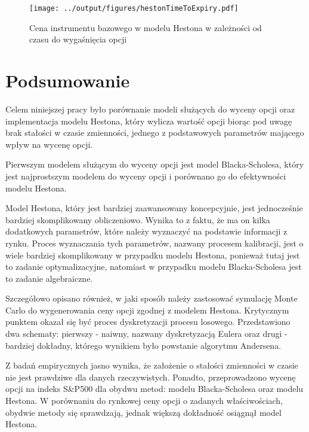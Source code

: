 \documentclass{pracamgr}
\begin{document}
\begin{figure}
  \texttt{[image: ../output/figures/hestonTimeToExpiry.pdf]}
  \caption{Cena instrumentu bazowego w modelu Hestona w zależności od czasu do wygaśnięcia opcji}
  \label{fig:hestonTimeToExpiry}
\end{figure}


\cleardoublepage
{}
\chapter*{Podsumowanie}\label{r:ending}
 

Celem niniejszej pracy było porównanie modeli służących do wyceny
opcji oraz implementacja modelu Hestona, który wylicza wartość opcji biorąc
pod uwagę brak stałości w czasie zmienności, jednego z podstawowych parametrów
mającego wpływ na wycenę opcji. 

Pierwszym modelem służącym do wyceny opcji jest model Blacka-Scholesa, który jest
najprostszym modelem do wyceny opcji i porównano go do efektywności modelu 
Hestona. 

Model Hestona, który jest bardziej zaawansowany koncepcyjnie, jest jednocześnie 
bardziej skomplikowany obliczeniowo. Wynika to z faktu, że ma on kilka dodatkowych
parametrów, które należy wyznaczyć na podstawie informacji z rynku. Proces wyznaczania tych 
parametrów, nazwany procesem kalibracji, jest o wiele bardziej skomplikowany w przypadku 
modelu Hestona, ponieważ tutaj jest to zadanie optymalizacyjne, natomiast w przypadku modelu
Blacka-Scholesa jest to zadanie algebraiczne.

Szczegółowo opisano również, w jaki sposób należy zastosować symulację Monte Carlo do 
wygenerowania ceny opcji zgodnej z modelem Hestona. Krytycznym punktem okazał się być
proces dyskretyzacji procesu losowego. Przedstawiono dwa schematy: pierwszy - naiwny, nazwany
dyskretyzacją Eulera oraz drugi - bardziej dokładny, którego wynikiem było powstanie 
algorytmu Andersena. 

Z badań empirycznych jasno wynika, że założenie o stałości zmienności w czasie nie jest 
prawdziwe dla danych rzeczywistych. Ponadto, przeprowadzono wycenę opcji na indeks 
S\&P500 dla obydwu metod: modelu Blacka-Scholesa oraz modelu Hestona. 
W porównaniu do rynkowej ceny opcji o zadanych właściwościach, obydwie metody się 
sprawdzają, jednak większą dokładność osiągnął model Hestona.
\end{document}

